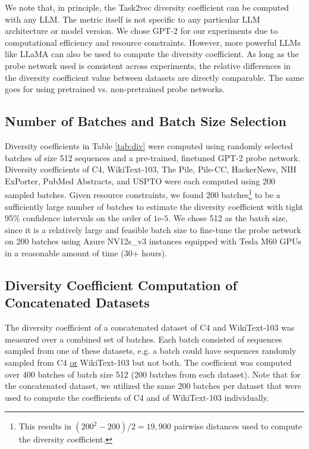 \documentclass[10pt]{article} %
\begin{document}
We note that, in principle, the Task2vec diversity coefficient can be computed with any LLM. The metric itself is not specific to any particular LLM architecture or model version. We chose GPT-2 for our experiments due to computational efficiency and resource constraints. However, more powerful LLMs like LLaMA can also be used to compute the diversity coefficient. As long as the probe network used is consistent across experiments, the relative differences in the diversity coefficient value between datasets are directly comparable. The same goes for using pretrained vs. non-pretrained probe networks.

\subsection{Number of Batches and Batch Size Selection}
\label{appendix:parameter_selection}
Diversity coefficients in Table \ref{tab:div} were computed using randomly selected batches of size 512 sequences and a pre-trained, finetuned GPT-2 probe network. Diversity coefficients of C4, WikiText-103, The Pile, Pile-CC, HackerNews, NIH ExPorter, PubMed Abstracts, and USPTO were each computed using 200 sampled batches. Given resource constraints, we found 200 batches\footnote{This results in $(200^2-200)/2 = 19,900$ pairwise distances used to compute the diversity coefficient.} to be a sufficiently large number of batches to estimate the diversity coefficient with tight 95\% confidence intervals on the order of $1\text{e-}5$. We chose 512 as the batch size, since it is a relatively large and feasible batch size to fine-tune the probe network on 200 batches using Azure NV12s\_v3 instances equipped with Tesla M60 GPUs in a reasonable amount of time (30+ hours). 

\subsection{Diversity Coefficient Computation of Concatenated Datasets}
\label{appendix:concat_datasets}
The diversity coefficient of a concatenated dataset of C4 and WikiText-103 was measured over a combined set of batches.
Each batch consisted of sequences sampled from one of these datasets, e.g. a batch could have sequences randomly sampled from C4 \underline{or} WikiText-103 but not both.
The coefficient was computed over 400 batches of batch size 512 (200 batches from each dataset). 
Note that for the concatenated dataset, we utilized the same 200 batches per dataset that were used to compute the coefficients of C4 and of WikiText-103 individually.
\end{document}
